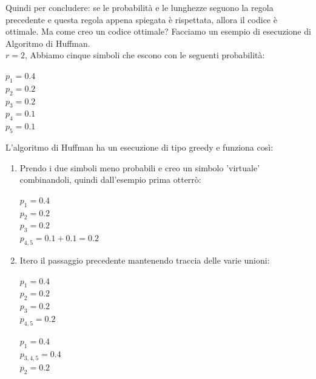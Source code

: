Quindi per concludere: se le probabilità e le lunghezze seguono la regola precedente e questa regola appena spiegata è rispettata, allora il codice è ottimale.
Ma come creo un codice ottimale?
\newpage
Facciamo un esempio di esecuzione di Algoritmo di Huffman.\\
$r=2$, Abbiamo cinque simboli che escono con le seguenti probabilità:
\begin{center}
	$p_1 = 0.4$\\
	$p_2 = 0.2$\\
	$p_3 = 0.2$\\
	$p_4 = 0.1$\\
	$p_5 = 0.1$
\end{center}
L'algoritmo di Huffman ha un esecuzione di tipo greedy e funziona così:
\begin{enumerate}
\item Prendo i due simboli meno probabili e creo un simbolo 'virtuale' combinandoli, quindi dall'esempio prima otterrò:
\begin{center}
	$p_1 = 0.4$\\
	$p_2 = 0.2$\\
	$p_3 = 0.2$\\
	\hspace{20mm}$p_{4,5} = 0.1 + 0.1=0.2$
\end{center}
\item Itero il passaggio precedente mantenendo traccia delle varie unioni:
\begin{multicols}{3}
	\begin{center}
		$p_1 = 0.4$\\
		$p_2 = 0.2$\\
		$p_3 = 0.2$\\
		$p_{4,5} = 0.2$
	\end{center}
	
	\columnbreak
	
	\begin{center}
		$p_1 = 0.4$\\
		$p_{3,4,5} = 0.4$\\
		$p_2 = 0.2$
	\end{center}  

	\columnbreak
	

\end{multicols}
\end{enumerate}

